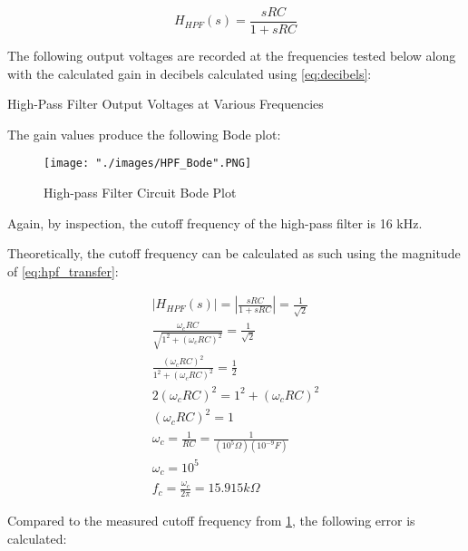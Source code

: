 \documentclass{article}
\begin{document}
	\begin{equation}
	\label{eq:hpf_transfer}
	H_{HPF}(s) = \frac{sRC}{1+sRC}
	\end{equation}
	
	The following output voltages are recorded at the frequencies tested below along with the calculated gain in decibels calculated using \ref{eq:decibels}:
	
	\FloatBarrier
	
	\begin{table}[h!]
		\centering
		\caption{High-Pass Filter Output Voltages at Various Frequencies}
		\label{tab:hpf_vout}
	\end{table}
	
	\FloatBarrier
	
	The gain values produce the following Bode plot:
	
	\FloatBarrier
	
	\begin{figure}[h!]
		\centering
		\texttt{[image: "./images/HPF\_Bode".PNG]}
		\caption{High-pass Filter Circuit Bode Plot}
		\label{fig:HPF_Bode}
	\end{figure}
	
	\FloatBarrier
	
	Again, by inspection, the cutoff frequency of the high-pass filter is 16 kHz.
	
	Theoretically, the cutoff frequency can be calculated as such using the magnitude of \ref{eq:hpf_transfer}:
	
	\begin{equation}
	\label{eq:hpf_cutoff}
	\begin{gathered}
	|H_{HPF}(s)| = |\frac{sRC}{1+sRC}| = \frac{1}{\sqrt{2}}\\
	\frac{\omega_{c}RC}{\sqrt{1^2 + (\omega_{c} RC)^2}} = \frac{1}{\sqrt{2}}\\
	\frac{(\omega_{c}RC)^2}{1^2 + (\omega_{c} RC)^2} = \frac{1}{2}\\
	2(\omega_{c} RC)^2 = 1^2 + (\omega_{c} RC)^2\\
	(\omega_{c} RC)^2 = 1\\
	\omega_{c} = \frac{1}{RC} = \frac{1}{(10^5 \Omega)(10^{-9} F)}\\
	\omega_{c} = 10^5\\
	f_{c}  = \frac{\omega_{c}}{2\pi} = 15.915 k\Omega
	\end{gathered}
	\end{equation}
	
	Compared to the measured cutoff frequency from \ref{fig:HPF_Bode}, the following error is calculated:
	
\end{document}

